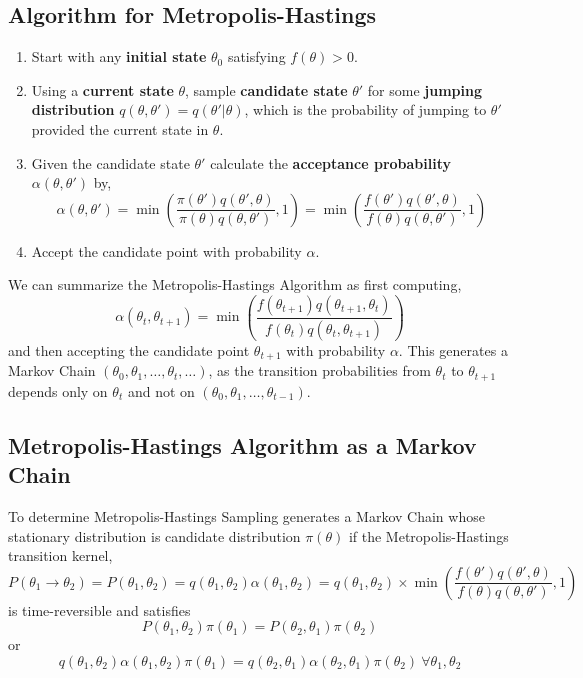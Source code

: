 \subsection{Algorithm for Metropolis-Hastings}
\begin{enumerate}
	\item Start with any \textbf{initial state}  $ \theta_0 $ satisfying $ f(\theta) > 0 $.
	\item Using a \textbf{current state}  $ \theta $, sample \textbf{candidate state} $ \theta' $ for some \textbf{jumping distribution} $ q(\theta, \theta') = q(\theta'|\theta) $, which is the probability of jumping to $ \theta' $ provided the current state in $ \theta $.
	\item Given the candidate state $ \theta' $ calculate the \textbf{acceptance probability} $ \alpha(\theta,\theta') $ by,
	      \[
		      \alpha(\theta,\theta') =\min\left( \frac{\pi(\theta')q(\theta', \theta)}{\pi(\theta)q(\theta, \theta')}, 1\right) = \min\left( \frac{f(\theta')q(\theta', \theta)}{f(\theta)q(\theta, \theta')} , 1\right)
	      \]
      \item  Accept the candidate point with probability $ \alpha $.

\end{enumerate}
We can summarize the Metropolis-Hastings Algorithm as first computing,
\[ 
    \alpha(\theta_{t},\theta_{t+1}) = \min \left( \frac{f(\theta_{t+1})q(\theta_{t+1},\theta_t)}{ f(\theta_t) q(\theta_t,\theta_{t+1}) } \right)
\]
and then accepting the candidate point $ \theta_{t+1} $ with probability $ \alpha $. This generates a Markov Chain $ ( \theta_0,\theta_1,\ldots,\theta_t,\ldots ) $,
as the transition probabilities from $ \theta_t $ to $ \theta_{t+1} $ depends only on $ \theta_t $ and not on $ (\theta_0,\theta_1,\ldots,\theta_{t-1}) $.

\subsection{Metropolis-Hastings Algorithm as a Markov Chain}
To determine Metropolis-Hastings Sampling generates a Markov Chain whose stationary distribution is candidate distribution $ \pi(\theta) $ if the Metropolis-Hastings transition kernel,
\begin{equation}
    \label{transition-kernel}
    P(\theta_1\to \theta_2) = P(\theta_1,\theta_2) = q(\theta_1,\theta_2)\alpha(\theta_1,\theta_2) = q(\theta_1,\theta_2)\times \min\left( \frac{f(\theta')q(\theta', \theta)}{f(\theta)q(\theta, \theta')} , 1\right)
\end{equation}
 is time-reversible and satisfies 
 \[
         P(\theta_1, \theta_2) \pi(\theta_1) = P(\theta_2, \theta_1) \pi(\theta_2)
 \]
 or 
 \begin{equation}
     \label{balance-equatation}
     q(\theta_1,\theta_2)\alpha(\theta_1,\theta_2)\pi(\theta_1) = q(\theta_2,\theta_1)\alpha(\theta_2,\theta_1)\pi(\theta_2) \ \forall \theta_1, \theta_2
 \end{equation}

